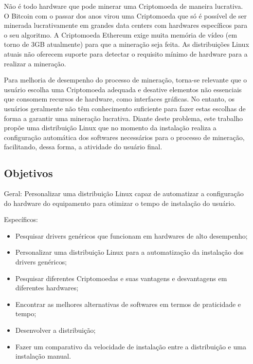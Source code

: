 \documentclass[
article,			%
12pt,				%
openright,			%
oneside,			%
a4paper,			%
chapter=TITLE,		%
section=TITLE,		%
subsection=TITLE,	%
subsubsection=TITLE,%
subsubsubsection=TITLE, %
english,			%
brazil,				%
]{abntex2}
\begin{document}
Não é todo hardware que pode minerar uma Criptomoeda de maneira
lucrativa. O Bitcoin com o passar dos anos virou uma Criptomoeda que
só é possível de ser minerada lucrativamente em grandes data centers
com hardwares específicos para o seu algoritmo. A Criptomoeda Ethereum
exige muita memória de vídeo (em torno de 3GB atualmente) para que a
mineração seja feita. As distribuições Linux atuais não oferecem
suporte para detectar o requisito mínimo de hardware para a realizar a
mineração.

Para melhoria de desempenho do processo de mineração, torna-se
relevante que o usuário escolha uma Criptomoeda adequada e desative
elementos não essenciais que consomem recursos de hardware, como
interfaces gráficas. No entanto, os usuários geralmente não têm
conhecimento suficiente para fazer estas escolhas de forma a garantir
uma mineração lucrativa. Diante deste problema, este trabalho propõe
uma distribuição Linux que no momento da instalação realiza a
configuração automática dos softwares necessários para o processo de
mineração, facilitando, dessa forma, a atividade do usuário final.

\subsection{Objetivos}

Geral: Personalizar uma distribuição Linux capaz de automatizar a
configuração do hardware do equipamento para otimizar o tempo de
instalação do usuário.

Específicos: 
\begin{itemize} 

    \item Pesquisar drivers genéricos que funcionam em
        hardwares de alto desempenho;

    \item Personalizar uma distribuição Linux para a automatização da
        instalação dos drivers genéricos;

    \item Pesquisar diferentes Criptomoedas e suas vantagens e
        desvantagens em diferentes hardwares;

    \item Encontrar as melhores alternativas de softwares em termos de
        praticidade e tempo;

    \item Desenvolver a distribuição;

    \item Fazer um comparativo da velocidade de instalação entre a
distribuição e uma instalação manual.

\end{itemize}
\end{document}
